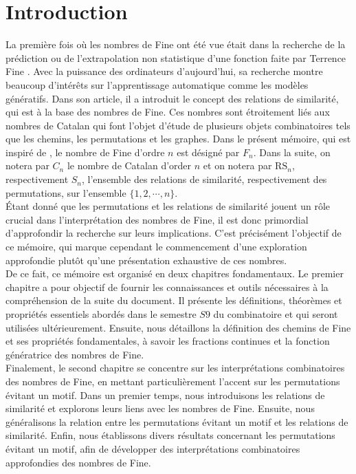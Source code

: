 \section*{Introduction}
\vspace*{20pt}
La première fois où les nombres de Fine ont été vue était dans la recherche de la prédiction ou de l'extrapolation non statistique d'une fonction faite par Terrence Fine \cite{TFine}. Avec la puissance des ordinateurs d'aujourd'hui, sa recherche montre beaucoup d'intérêts sur l'apprentissage automatique comme les modèles génératifs. Dans son article, il a introduit le concept des relations de similarité, qui est à la base des nombres de Fine.
Ces nombres sont étroitement liés aux nombres de Catalan qui font l'objet d'étude de plusieurs objets combinatoires tels que les chemins, les permutations et les graphes. Dans le présent mémoire, qui est inspiré de \cite{RRP}, le nombre de Fine d'ordre $n$ est désigné par $F_{n}$. Dans la suite, on notera par $C_{n}$ le nombre de Catalan d'order $n$ et on notera par $\text{RS}_{n}$, respectivement $S_{n}$, l'ensemble des relations de similarité, respectivement des permutations, sur l'ensemble $\{1, 2, \cdots, n\}$.\vspace{5pt}\\

Étant donné que les permutations et les relations de similarité jouent un rôle crucial dans l'interprétation des nombres de Fine, il est donc primordial d'approfondir la recherche sur leurs implications. C'est précisément l'objectif de ce mémoire, qui marque cependant le commencement d'une exploration approfondie plutôt qu'une présentation exhaustive de ces nombres. \vspace{5pt}\\

De ce fait, ce mémoire est organisé en deux chapitres fondamentaux. Le premier chapitre a pour objectif de fournir les connaissances et outils nécessaires à la compréhension de la suite du document. Il présente les définitions, théorèmes et propriétés essentiels abordés dans le semestre $S9$ du combinatoire et qui seront utilisées ultérieurement. Ensuite, nous détaillons la définition des chemins de Fine et ses propriétés fondamentales, à savoir les fractions continues et la fonction génératrice des nombres de Fine. \vspace*{5pt}\\

Finalement, le second chapitre se concentre sur les interprétations combinatoires des nombres de Fine, en mettant particulièrement l'accent sur les permutations évitant un motif. Dans un premier temps, nous introduisons les relations de similarité et explorons leurs liens avec les nombres de Fine. Ensuite, nous généralisons la relation entre les permutations évitant un motif et les relations de similarité. Enfin, nous établissons divers résultats concernant les permutations évitant un motif, afin de développer des interprétations combinatoires approfondies des nombres de Fine.\\
\newpage

